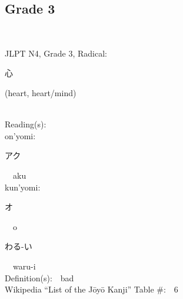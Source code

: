 
\subsection*{Grade 3 }
  \label{P1-3}
\begin{multicols}{2}
{\fontsize{34pt}{40pt}  }\ \ \\  %
{JLPT N4, Grade 3, Radical:\ \ {\begin{CJK}{UTF8}{min} 心 \end{CJK}} (heart, heart/mind) } \\
Reading(s):\ \ \\
{\hspace*{1em}}on'yomi:\ \ \\
{\hspace*{2em}}{\begin{CJK}{UTF8}{min} アク \end{CJK}}\ \ aku\ \ \\
{\hspace*{1em}}kun'yomi:\ \ \\
{\hspace*{2em}}{\begin{CJK}{UTF8}{min} オ \end{CJK}}\ \ o\ \ \\
{\hspace*{2em}}{\begin{CJK}{UTF8}{min} わる-い \end{CJK}}\ \ waru-i\ \ \\
Definition(s):\ \ bad \\
Wikipedia ``List of the J\=oy\=o Kanji'' Table \#:\ \ 6 \\
\ \ \\
{\fontsize{34pt}{40pt}  }\ \ \\  %

\end{multicols}
